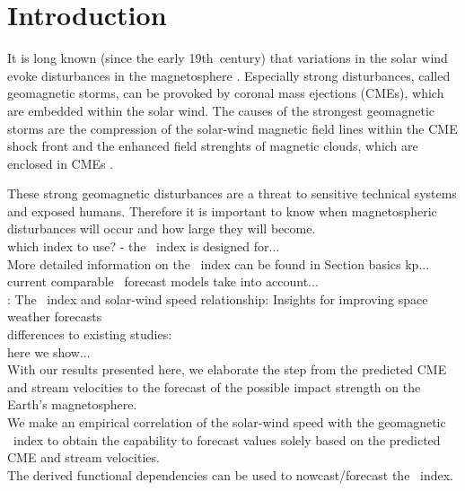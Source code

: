 
\section{Introduction}
It is long known (since the early 19th~century) that variations in the solar wind evoke disturbances in the magnetosphere \citep{Bartels1962}. Especially strong disturbances, called geomagnetic storms, can be provoked by coronal mass ejections (CMEs), which are embedded within the solar wind. The causes of the strongest geomagnetic storms are the compression of the solar-wind magnetic field lines within the CME shock front and the enhanced field strenghts of magnetic clouds, which are enclosed in CMEs \citep{Bothmer1993}.

These strong geomagnetic disturbances are a threat to sensitive technical systems and exposed humans. Therefore it is important to know when magnetospheric disturbances will occur and how large they will become.\\


which index to use? - the \Kp{}~index is designed for...\\
More detailed information on the \Kp{}~index can be found in Section basics kp...\\

current comparable \Kp~forecast models take into account...\\
\citet{Elliott2013}: The \Kp~index and solar-wind speed relationship: Insights for improving space weather forecasts\\

differences to existing studies:\\
here we show...\\
With our results presented here, we elaborate the step from the predicted CME and stream velocities to the forecast of the possible impact strength on the Earth's magnetosphere.\\
We make an empirical correlation of the solar-wind speed with the geomagnetic \Kp~index to obtain the capability to forecast \Kp{} values solely based on the predicted CME and stream velocities.\\
The derived functional dependencies can be used to nowcast/forecast the \Kp~index.\\



